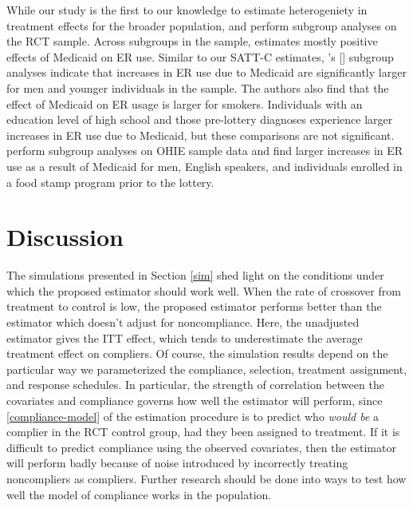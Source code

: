 \documentclass[hidelinks,12pt]{article}
\newcommand{\possessivecite}[1]{\citeauthor{#1}'s [\citeyear{#1}]}
\begin{document}
While our study is the first to our knowledge to estimate heterogeniety in treatment effects for the broader population, \citet{Taubman} and \citet{NBERw22363} perform subgroup analyses on the RCT sample. Across subgroups in the sample, \citet{Taubman} estimates mostly positive effects of Medicaid on ER use. Similar to our SATT-C estimates, \possessivecite{Taubman} subgroup analyses indicate that increases in ER use due to Medicaid are significantly larger for men and younger individuals in the sample. The authors also find that the effect of Medicaid on ER usage is larger for smokers. Individuals with an education level of high school and those pre-lottery diagnoses experience larger increases in ER use due to Medicaid, but these comparisons are not significant. \citet{NBERw22363} perform subgroup analyses on OHIE sample data and find larger increases in ER use as a result of Medicaid for men, English speakers, and individuals enrolled in a food stamp program prior to the lottery. 

\section{Discussion} \label{discussion}

The simulations presented in Section \ref{sim} shed light on the conditions under which the proposed estimator should work well. When the rate of crossover from treatment to control is low, the proposed estimator performs better than the estimator which doesn't adjust for noncompliance. Here, the unadjusted estimator gives the ITT effect, which tends to underestimate the average treatment effect on compliers. Of course, the simulation results depend on the particular way we parameterized the compliance, selection, treatment assignment, and response schedules. In particular, the strength of correlation between the covariates and compliance governs how well the estimator will perform, since \ref{compliance-model} of the estimation procedure is to predict who \textit{would be} a complier in the RCT control group, had they been assigned to treatment. If it is difficult to predict compliance using the observed covariates, then the estimator will perform badly because of noise introduced by incorrectly treating noncompliers as compliers. Further research should be done into ways to test how well the model of compliance works in the population. 
\end{document}
